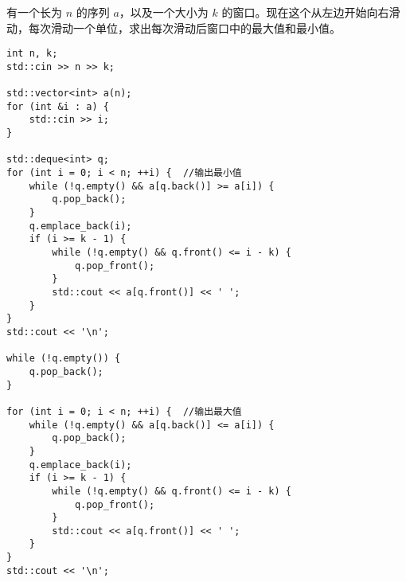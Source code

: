 有一个长为 $n$ 的序列 $a$，以及一个大小为 $k$ 的窗口。现在这个从左边开始向右滑动，每次滑动一个单位，求出每次滑动后窗口中的最大值和最小值。
\begin{lstlisting}
int n, k;
std::cin >> n >> k;

std::vector<int> a(n);
for (int &i : a) {
	std::cin >> i;
}

std::deque<int> q;
for (int i = 0; i < n; ++i) {  //输出最小值
	while (!q.empty() && a[q.back()] >= a[i]) {
		q.pop_back();
	}
	q.emplace_back(i);
	if (i >= k - 1) {
		while (!q.empty() && q.front() <= i - k) {
			q.pop_front();
		}
		std::cout << a[q.front()] << ' ';
	}
}
std::cout << '\n';

while (!q.empty()) {
	q.pop_back();
}

for (int i = 0; i < n; ++i) {  //输出最大值
	while (!q.empty() && a[q.back()] <= a[i]) {
		q.pop_back();
	}
	q.emplace_back(i);
	if (i >= k - 1) {
		while (!q.empty() && q.front() <= i - k) {
			q.pop_front();
		}
		std::cout << a[q.front()] << ' ';
	}
}
std::cout << '\n';
\end{lstlisting}